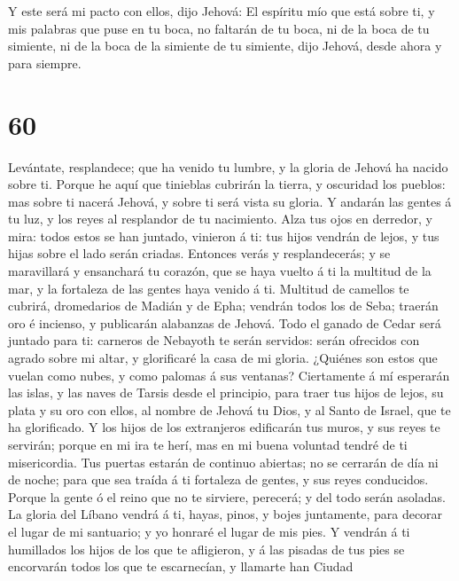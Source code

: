  Y este será mi pacto con ellos, dijo Jehová: El espíritu
mío que está sobre ti, y mis palabras que puse en tu boca, no faltarán
de tu boca, ni de la boca de tu simiente, ni de la boca de la simiente
de tu simiente, dijo Jehová, desde ahora y para siempre.

\hypertarget{section-59}{%
\section{60}\label{section-59}}

 Levántate, resplandece; que ha venido tu lumbre, y la
gloria de Jehová ha nacido sobre ti.  Porque he aquí que
tinieblas cubrirán la tierra, y oscuridad los pueblos: mas sobre ti
nacerá Jehová, y sobre ti será vista su gloria.  Y andarán
las gentes á tu luz, y los reyes al resplandor de tu nacimiento.
 Alza tus ojos en derredor, y mira: todos estos se han
juntado, vinieron á ti: tus hijos vendrán de lejos, y tus hijas sobre el
lado serán criadas.  Entonces verás y resplandecerás; y se
maravillará y ensanchará tu corazón, que se haya vuelto á ti la multitud
de la mar, y la fortaleza de las gentes haya venido á ti. 
Multitud de camellos te cubrirá, dromedarios de Madián y de Epha;
vendrán todos los de Seba; traerán oro é incienso, y publicarán
alabanzas de Jehová.  Todo el ganado de Cedar será juntado
para ti: carneros de Nebayoth te serán servidos: serán ofrecidos con
agrado sobre mi altar, y glorificaré la casa de mi gloria. 
¿Quiénes son estos que vuelan como nubes, y como palomas á sus ventanas?
 Ciertamente á mí esperarán las islas, y las naves de Tarsis
desde el principio, para traer tus hijos de lejos, su plata y su oro con
ellos, al nombre de Jehová tu Dios, y al Santo de Israel, que te ha
glorificado.  Y los hijos de los extranjeros edificarán tus
muros, y sus reyes te servirán; porque en mi ira te herí, mas en mi
buena voluntad tendré de ti misericordia.  Tus puertas
estarán de continuo abiertas; no se cerrarán de día ni de noche; para
que sea traída á ti fortaleza de gentes, y sus reyes conducidos.
 Porque la gente ó el reino que no te sirviere, perecerá; y
del todo serán asoladas.  La gloria del Líbano vendrá á ti,
hayas, pinos, y bojes juntamente, para decorar el lugar de mi santuario;
y yo honraré el lugar de mis pies.  Y vendrán á ti
humillados los hijos de los que te afligieron, y á las pisadas de tus
pies se encorvarán todos los que te escarnecían, y llamarte han Ciudad

